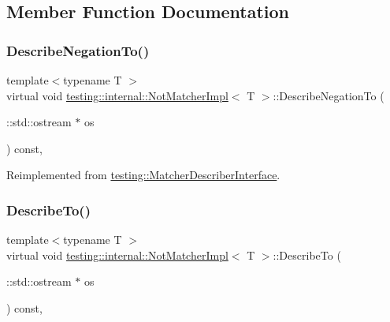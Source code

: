 \subsection{Member Function Documentation}
\mbox{\label{classtesting_1_1internal_1_1_not_matcher_impl_a960f799e25ba7264d0d45fa61bb9271c}} 
\subsubsection{\texorpdfstring{Describe\+Negation\+To()}{DescribeNegationTo()}}
{\footnotesize\ttfamily template$<$typename T $>$ \\
virtual void \hyperlink{classtesting_1_1internal_1_1_not_matcher_impl}{testing\+::internal\+::\+Not\+Matcher\+Impl}$<$ T $>$\+::Describe\+Negation\+To (\begin{DoxyParamCaption}\item[{\+::std\+::ostream $\ast$}]{os }\end{DoxyParamCaption}) const\hspace{0.3cm}{\ttfamily [inline]}, {\ttfamily [virtual]}}



Reimplemented from \hyperlink{classtesting_1_1_matcher_describer_interface_a2071afbc47097c4d1c0064275af34db0}{testing\+::\+Matcher\+Describer\+Interface}.

\mbox{\label{classtesting_1_1internal_1_1_not_matcher_impl_a2c22d3e15126decd9c6af132d4f4b60f}} 
\subsubsection{\texorpdfstring{Describe\+To()}{DescribeTo()}}
{\footnotesize\ttfamily template$<$typename T $>$ \\
virtual void \hyperlink{classtesting_1_1internal_1_1_not_matcher_impl}{testing\+::internal\+::\+Not\+Matcher\+Impl}$<$ T $>$\+::Describe\+To (\begin{DoxyParamCaption}\item[{\+::std\+::ostream $\ast$}]{os }\end{DoxyParamCaption}) const\hspace{0.3cm}{\ttfamily [inline]}, {\ttfamily [virtual]}}



